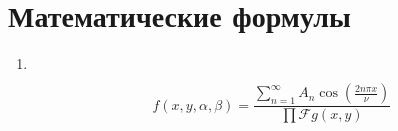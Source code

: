\documentclass[11pt]{article}
\begin{document}
\center\section*{Математические формулы}
\begin{enumerate}
 по $t$ порядка $(n-1)$ в точке $t=\tau$ терпит скачок равный единице
\[
	\frac{\partial^{n-1}G(\tau+0,\tau)}{\partial t^{n-1}}-\frac{\partial^{n-1}G(\tau-0,\tau)}{\partial t^{n-1}}=1.
\]
-функция $g(t)$ имеет вид
\[
	g(t)=\int\limits_a^t (b(\tau)+\Phi^{-1}e_n)f(\tau)dt+\int\limits_t^b b(\tau)f(\tau)dt.
\]
 Грина имеет вид
\[
			G(t,\tau)=
			\begin{cases}
				\Phi(t)F\Phi^{-1}(\tau), & t\le\tau,\\
				\Phi(t)(I+F)\Phi^{-1}(\tau), & \tau<t,
			\end{cases}
\]
\\ где $F=-V^{-1}N\Phi(b)$.
 ряд
\[
	\sum\limits_{k=0}^{\infty}e^{-k(A+iB)}=
		\frac
			{e^A-\cos(B)+i\sin(B)}
			{2(\ch(A)-\cos(B))}
\]
 множественный коэффициент корреляции
\[
	\hat R_{yx}^2=1-\frac{\det R}{\left| R\right|_{00}}=
		\begin{pmatrix}
			1 & \hat r_{yx_1} & \hat r_{yx_2} \\
			\hat r_{x_1y} & 1 & \hat r_{x_1x_2} \\
			\hat r_{x_2y} & \hat r_{x_2x_1} & 1
		\end{pmatrix}
\]
\item
\[
	
\]
	
\[
		f(x,y,\alpha, \beta) =
		 	\frac
				{\sum \limits_{n=1}^{\infty}A_n \cos \left( \frac{2 n \pi x}{\nu} \right)}
			 	{\prod \mathcal{F} {g(x,y)} } 
\]
\end{enumerate}
\end{document}
